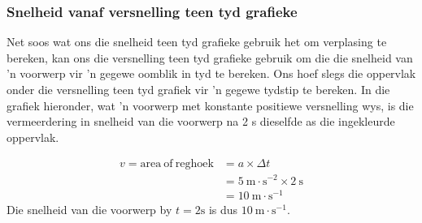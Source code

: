 \subsubsection*{Snelheid vanaf versnelling teen tyd grafieke}
            \nopagebreak
Net soos wat ons die snelheid teen tyd grafieke gebruik het om verplasing te bereken, kan ons die versnelling teen tyd grafieke gebruik om die die snelheid van 'n voorwerp vir 'n gegewe oomblik in tyd te bereken. Ons hoef slegs die oppervlak onder die versnelling teen tyd grafiek vir 'n gegewe tydstip te bereken. In die grafiek hieronder, wat 'n voorwerp met konstante positiewe versnelling wys, is die vermeerdering in snelheid van die voorwerp na 2 s dieselfde as die ingekleurde oppervlak. \par
          \label{m38795*id72760}\nopagebreak\noindent{}
            
    \begin{align*}
    v=\text{area}~\text{of}~\text{reghoek}&= a\ensuremath{\times}\Delta t\\ 
      &= 5~\text{m}\ensuremath{\cdot}{\text{s}}^{-2}\ensuremath{\times}2~\text{s}\\ 
      &= 10~\text{m}\ensuremath{\cdot}{\text{s}}^{-1}
      \end{align*}
Die snelheid van die voorwerp by $t=2\text{s}$ is dus $10~\text{m}\ensuremath{\cdot}\text{s}{}^{-1}$. %
    \label{m38795*cid8}


